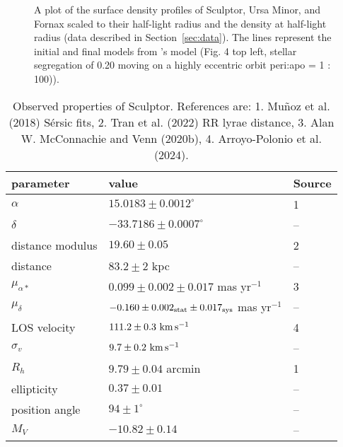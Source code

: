 \begin{figure}
\centering
{}
\caption[Sculptor and Ursa Minor match tidal models]{A plot of the
surface density profiles of Sculptor, Ursa Minor, and Fornax scaled to
their half-light radius and the density at half-light radius (data
described in Section~\ref{sec:data}). The lines represent the initial
and final models from \citet{PNM2008}'s model (Fig. 4 top left, stellar
segregation of 0.20 moving on a highly eccentric orbit peri:apo = 1 :
100)).}\label{fig:scl_umi_vs_penarrubia}
\end{figure}

\begin{table*}[t]
\centering
\caption[Observed Properties of Sculptor]{Observed properties of Sculptor. References are: 1. Muñoz et al. (2018) Sérsic fits, 2. Tran et al. (2022) RR lyrae distance, 3. Alan W. McConnachie and Venn (2020b), 4. Arroyo-Polonio et al. (2024). }
\label{tbl:scl_obs_props}
\begin{tabular}{lll}
\toprule
parameter & value & Source\\
\midrule
$\alpha$ & $15.0183 \pm 0.0012^\circ$ & 1\\
$\delta$ & $-33.7186 \pm 0.0007^\circ$ & –\\
distance modulus & $19.60 \pm 0.05$ & 2\\
distance & $83.2 \pm 2$ kpc & –\\
$\mu_{\alpha*}$ & $0.099 \pm 0.002 \pm 0.017$ mas yr$^{-1}$ & 3\\
$\mu_\delta$ & $-0.160 \pm 0.002_{\rm stat} \pm 0.017_{\rm sys}$ mas yr$^{-1}$ & –\\
LOS velocity & $111.2 \pm 0.3\ {\rm km\,s^{-1}}$ & 4\\
$\sigma_v$ & $9.7\pm0.2\ {\rm km\,s^{-1}}$ & –\\
$R_h$ & $9.79 \pm 0.04$ arcmin & 1\\
ellipticity & $0.37 \pm 0.01$ & –\\
position angle & $94\pm1^\circ$ & –\\
$M_V$ & $-10.82\pm0.14$ & –\\
\bottomrule
\end{tabular}
\end{table*}

